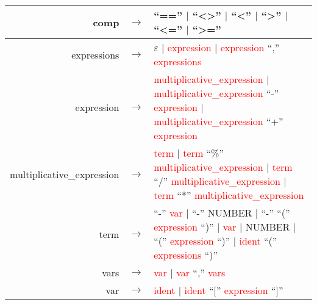 \documentclass{article}[12pt]
\newcommand{\prodrule}[1]{#1}
\newcommand{\nonterm}[1]{\textcolor{red}{#1}}
\newcommand{\term}[1]{#1}
\begin{document}
\begin{tabular}{r c p{10cm}}
	\prodrule{comp} & $\rightarrow$ &
		        \term{``==''} 
		$\vert$ \term{``\textless\textgreater''} 
		$\vert$ \term{``\textless''} 
		$\vert$ \term{``\textgreater''} 
		$\vert$ \term{``\textless=''} 
		$\vert$ \term{``\textgreater=''} \\
	\hline

	\prodrule{expressions} & $\rightarrow$ &
		        $\varepsilon$
		$\vert$ \nonterm{expression}
		$\vert$ \nonterm{expression} \term{``,''} \nonterm{expressions} \\
	\hline

	\prodrule{expression} & $\rightarrow$ &
		        \nonterm{multiplicative\_expression} \newline
		$\vert$ \nonterm{multiplicative\_expression} \term{``-''} \nonterm{expression} \newline
		$\vert$ \nonterm{multiplicative\_expression} \term{``+''} \nonterm{expression} \\
	\hline

	\prodrule{multiplicative\_expression} & $\rightarrow$ &
		        \nonterm{term} 
		$\vert$ \nonterm{term} \term{``\%''} \nonterm{multiplicative\_expression} 
		$\vert$ \nonterm{term} \term{``/''} \nonterm{multiplicative\_expression} 
		$\vert$ \nonterm{term} \term{``*''} \nonterm{multiplicative\_expression} \\
	\hline

	\prodrule{term} & $\rightarrow$ &
		        \term{``-''} \nonterm{var} \newline
		$\vert$ \term{``-''} \term{NUMBER} \newline
		$\vert$ \term{``-''} \term{``(''} \nonterm{expression} \term{``)''} \newline
		$\vert$ \nonterm{var} \newline
		$\vert$ \term{NUMBER} \newline
		$\vert$ \term{``(''} \nonterm{expression} \term{``)''} \newline
		$\vert$ \nonterm{ident} \term{``(''} \nonterm{expressions} \term{``)''} \\
	\hline

	\prodrule{vars} & $\rightarrow$ &
		        \nonterm{var}
		$\vert$ \nonterm{var} \term{``,''} \nonterm{vars} \\
	\hline

	\prodrule{var} & $\rightarrow$ &
		        \nonterm{ident}
		$\vert$ \nonterm{ident} \term{``[''} \nonterm{expression} \term{``]''} \\
\end{tabular}
\end{document}
